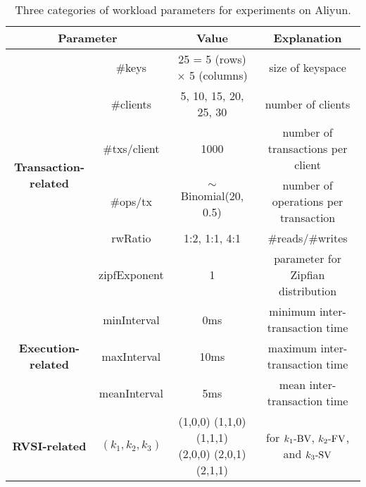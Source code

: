 \begin{table}[!t]
  \centering
  \renewcommand*{\arraystretch}{1.2}
  \caption{Three categories of workload parameters for experiments on Aliyun.}
    { %
  \begin{tabular}{|c|c||c|c|}
	\hline
    \multicolumn{2}{|c||}{\textbf{Parameter}} & \textbf{Value}		& \textbf{Explanation}
	\\ \hline  \hline
    \multirow{6}{*}{\bf Transaction-related}
    &\#keys  						& 25 = 5 (rows) $\times$ 5 (columns)  	&  	size of keyspace
	\\ \cline{2-4}
	&\#clients						& 5, 10, 15, 20, 25, 30 & number of clients
    \\ \cline{2-4}
	&\#txs/client					& 1000 & number of transactions per client
	\\ \cline{2-4}
	&\#ops/tx				& $\sim$ Binomial(20, 0.5) &  number of operations per transaction
	\\ \cline{2-4}
	&rwRatio							& 1:2, 1:1, 4:1 & {\#reads}/{\#writes}
	\\ \cline{2-4}
	&zipfExponent					& 1		& parameter for Zipfian distribution
	\\ \hline  \hline
    \multirow{3}{*}{\bf Execution-related} & minInterval						& 0ms		& minimum inter-transaction time
	\\ \cline{2-4}
	&maxInterval						& 10ms		& maximum inter-transaction time
	\\ \cline{2-4}
	&meanInterval					& 5ms		& mean inter-transaction time
    \\ \hline \hline
    {\bf RVSI-related} & $(k_1, k_2, k_3)$		
		&  \innercell{c}{(1,0,0) (1,1,0) (1,1,1) \\ (2,0,0) (2,0,1) (2,1,1)}	
		&  for $k_1\text{-BV}{}$, $k_2\text{-FV}{}$, and $k_3\text{-SV}{}$
	\\ \hline
  \end{tabular}}
\end{table}
